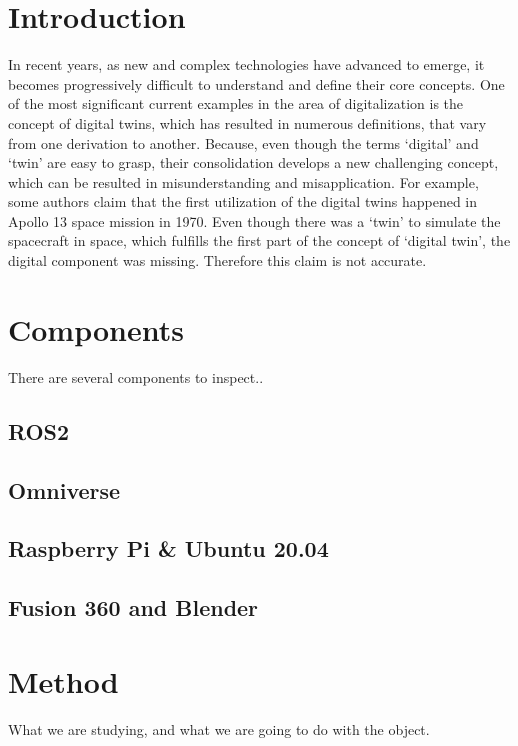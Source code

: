 \documentclass[conference]{IEEEtran}
\begin{document}
    \section{Introduction}\label{section:introduction}
    In recent years, as new and complex technologies have advanced to emerge, it becomes progressively 
    difficult to understand and define their core concepts. One of the most significant current examples in the 
    area of digitalization is the concept of digital twins, which has resulted in numerous definitions, that vary 
    from one derivation to another. Because, even though the terms `digital' and `twin' are easy to grasp,  their 
    consolidation develops a new challenging concept, which can be resulted in misunderstanding and misapplication. For example, 
    some authors claim that the first utilization of the digital twins 
    happened in Apollo 13 space mission in 1970.  
    Even though there was a `twin'  to simulate the spacecraft in space, which fulfills the first part of the concept of 
    `digital twin', the digital component was missing. Therefore this claim is not accurate.
    


    \section{Components}\label{section:components}
    There are several components to inspect..

    \subsection{ROS2}\label{section:ros2}
    \subsection{Omniverse}\label{section:Omniverse}
    \subsection{Raspberry Pi \& Ubuntu 20.04}\label{section:RaspberryPi}
    \subsection{Fusion 360 and Blender}\label{section:Fusion360}
    \section{Method}\label{section:method}
    What we are studying, and what we are going to do with the object.
\end{document}
